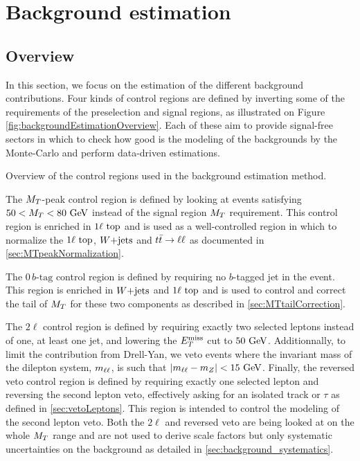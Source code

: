     \section{Background estimation \label{sec:analysis_backgroundEstimation}}

        \subsection{Overview}

    In this section, we focus on the estimation of the different background contributions.
    Four kinds of control regions are defined by inverting some of the requirements of the
    preselection and signal regions, as illustrated on Figure \ref{fig:backgroundEstimationOverview}.
    Each of these aim to provide signal-free sectors in which to check how good is the
    modeling of the backgrounds by the Monte-Carlo and perform data-driven estimations.

                     {Overview of the control regions used in the background estimation method. }

    The $M_T$-peak control region is defined by looking at events satisfying $50 < M_T <
    80~\text{GeV}$ instead of the signal region $M_T$ requirement. This control region is enriched
    in $1\ell~\text{top}$ and is used as a well-controlled region in which to normalize the
    $1\ell~\text{top}$, $\text{$W$+jets}$ and $t\bar{t} \rightarrow \ell \ell$ as documented in \ref{sec:MTpeakNormalization}.

    The $0\, b\text{-tag}$ control region is defined by requiring no $b$-tagged jet in the
    event. This region is enriched in $\text{$W$+jets}$ and $1\ell~\text{top}$ and is used to control
    and correct the tail of $M_T$ for these two components as described in \ref{sec:MTtailCorrection}.

    The $2\ell$ control region is defined by requiring exactly two selected leptons instead
    of one, at least one jet, and lowering the $E_T^\text{miss}$ cut to $50 ~\text{GeV}$. Additionnally, to limit the
    contribution from Drell-Yan, we veto events where the invariant mass of the dilepton
    system, $m_{\ell\ell}$, is such that $\left|m_{\ell\ell} - m_{Z}\right| < 15 ~\text{GeV}$.
    Finally, the reversed veto control region is defined by requiring exactly one selected
    lepton and reversing the second lepton veto, effectively asking for an isolated track
    or $\tau$ as defined in \ref{sec:vetoLeptons}. This region  is intended to control
    the modeling of the second lepton veto. Both the $2\ell$ and reversed veto are being
    looked at on the whole $M_T$ range and are not used to derive scale factors but only
    systematic uncertainties on the background as detailed in \ref{sec:background_systematics}.

